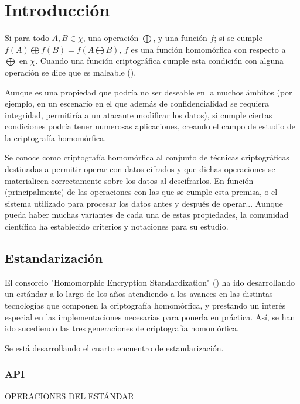 \chapter{Introducción}

Si para todo $ A,B \in \chi{} $, una operación $ \bigoplus $, y una función $f$; si se cumple $ f(A) \bigoplus f(B) = f(A \bigoplus B)$, $ f $ es una función homomórfica con respecto a $ \bigoplus $ en $ \chi{} $. Cuando una función criptográfica cumple esta condición con alguna operación se dice que es maleable (\cite{dolev_non-malleable_1991}). 

Aunque es una propiedad que podría no ser deseable en la muchos ámbitos (por ejemplo, en un escenario en el que además de confidencialidad se requiera integridad, permitiría a un atacante modificar los datos), si cumple ciertas condiciones podría tener numerosas aplicaciones, creando el campo de estudio de la criptografía homomórfica.

Se conoce como criptografía homomórfica al conjunto de técnicas criptográficas destinadas a permitir operar con datos cifrados y que dichas operaciones se materialicen correctamente sobre los datos al descifrarlos. En función (principalmente) de las operaciones con las que se cumple esta premisa, o el sistema utilizado para procesar los datos antes y después de operar... Aunque pueda haber muchas variantes de cada una de estas propiedades, la comunidad científica ha establecido criterios y notaciones para su estudio. 

\section{Estandarización}

El consorcio "Homomorphic Encryption Standardization" (\cite{noauthor_homomorphic_nodate-1}) ha ido desarrollando un estándar a lo largo de los años atendiendo a los avances en las distintas tecnologías que componen la criptografía homomórfica, y prestando un interés especial en las implementaciones necesarias para ponerla en práctica. Así, se han ido sucediendo las tres generaciones de criptografía homomórfica.

Se está desarrollando el cuarto encuentro de estandarización.


\subsection{API}

OPERACIONES DEL ESTÁNDAR

